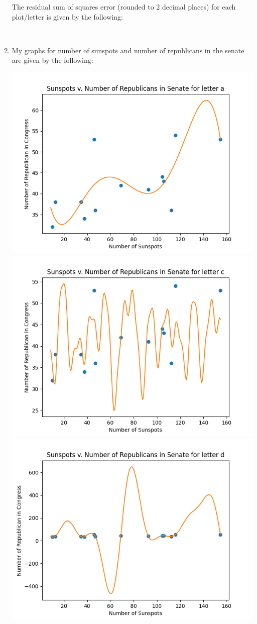 \documentclass[submit]{harvardml}
\begin{document}
\begin{solution}
\begin{enumerate}
    The residual sum of squares error (rounded to 2 decimal places) for each plot/letter is given by the following:
    
    \begin{center}
         \\
    \end{center}
    
    \newpage
    
    \item My graphs for number of sunspots and number of republicans in the senate are given by the following:
    
    \includegraphics[width=0.55\columnwidth]{latex hw/Prob4-Sunspots_v_Rep-a.png}
    \includegraphics[width=0.55\columnwidth]{latex hw/Prob4-Sunspots_v_Rep-c.png}
    \includegraphics[width=0.55\columnwidth]{latex hw/Prob4-Sunspots_v_Rep-d.png}
    

\end{enumerate}
\end{solution}
\end{document}

